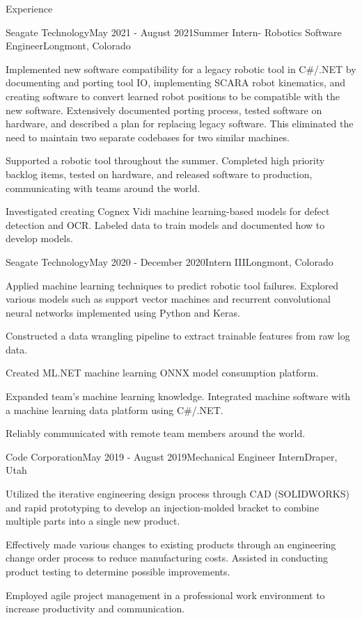 \documentclass{resume}
\begin{document}
\begin{rSection}{Experience}
    \begin{rSubsection}{Seagate Technology}{May 2021 - August 2021}{Summer Intern- Robotics Software Engineer}{Longmont, Colorado}
    \item Implemented new software compatibility for a legacy robotic tool in  C\#/.NET by documenting and porting tool IO, implementing SCARA robot kinematics, and creating software to convert learned robot positions to be compatible with the new software. 
    Extensively documented porting process, tested software on hardware, and described a plan for replacing legacy software. 
    This eliminated the need to maintain two separate codebases for two similar machines.
    \item Supported a robotic tool throughout the summer. Completed high priority backlog items, tested on hardware, and released software to production, communicating with teams around the world.
    \item Investigated creating Cognex Vidi machine learning-based models for defect detection and OCR. Labeled data to train models and documented how to develop models.
    \end{rSubsection}
  
    \begin{rSubsection}{Seagate Technology}{May 2020 - December 2020}{Intern III}{Longmont, Colorado}
    \item Applied machine learning techniques to predict robotic tool failures. 
    Explored various models such as support vector machines and recurrent convolutional neural networks implemented using Python and Keras. 
    \item Constructed a data wrangling pipeline to extract trainable features from raw log data. 
    \item Created ML.NET machine learning ONNX model consumption platform.
    \item Expanded team’s machine learning knowledge. Integrated machine software with a machine learning data platform using C\#/.NET.
    \item Reliably communicated with remote team members around the world.
    \end{rSubsection}

    \begin{rSubsection}{Code Corporation}{May 2019 - August 2019}{Mechanical Engineer Intern}{Draper, Utah}
    \item Utilized the iterative engineering design process through CAD (SOLIDWORKS) and rapid prototyping to develop an injection-molded bracket to combine multiple parts into a single new product.  
    \item Effectively made various changes to existing products through an engineering change order process to reduce manufacturing costs.  Assisted in conducting product testing to determine possible improvements.  
    \item Employed agile project management in a professional work environment to increase productivity and communication.
    \end{rSubsection}
 
  \end{rSection}
\end{document}

